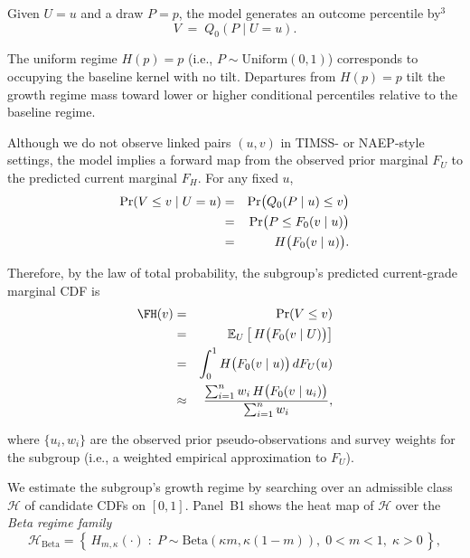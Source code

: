 \documentclass[10pt]{article}
\begin{document}
\begin{minipage}[t]{7.65in}
\begin{minipage}{7.35in}
    \vspace{1pt}
    Given $U=u$ and a draw $P=p$, the model generates an outcome percentile by$^\mbox{3}$
    \[
      V \;=\; Q_0(P\mid U=u).
    \]

    \vspace{1pt}
    The uniform regime $H(p)=p$ (i.e., $P\sim\mathrm{Uniform}(0,1)$) corresponds to occupying the 
    baseline kernel with no tilt. Departures from $H(p)=p$ tilt the growth regime mass toward 
    lower or higher conditional percentiles relative to the baseline regime.

    \vspace{4pt}
    Although we do not observe linked pairs $(u,v)$ in TIMSS- or NAEP-style settings, 
    the model implies a forward map from the observed prior marginal $F_U$ to the 
    predicted current marginal $F_H$. For any fixed $u$,
    \begin{eqnarray*}
      \Pr(V\le v\mid U=u)
      &=& \Pr\bigl(Q_0(P\mid u)\le v\bigr) \\
      &=& \Pr\bigl(P\le F_0(v\mid u)\bigr) \\
      &=& H\bigl(F_0(v\mid u)\bigr).
    \end{eqnarray*}

    \vspace{4pt}
    Therefore, by the law of total probability, the subgroup's predicted current-grade 
    marginal CDF is
    \begin{eqnarray*}
      \FH(v)
      &=& \Pr(V\le v) \\
      &=& \mathbb{E}_{U}\left[\,H\bigl(\Fzero(v\mid U)\bigr)\right] \\
      &=& \int_0^1 H\bigl(\Fzero(v\mid u)\bigr)\,dF_U(u) \\
      &\approx& \frac{\sum_{i=1}^{n} w_i\,H\bigl(\Fzero(v\mid u_i)\bigr)}{\sum_{i=1}^{n} w_i},
    \end{eqnarray*}

    \vspace{1pt}
    where $\{u_i,w_i\}$ are the observed prior pseudo-observations and 
    survey weights for the subgroup (i.e., a weighted empirical approximation to $F_U$).

    \vspace{4pt}
    We estimate the subgroup's growth regime by searching over an admissible 
    class $\mathcal{H}$ of candidate CDFs on $[0,1]$. Panel~B1 shows the heat 
    map of $\mathcal{H}$ over the \emph{Beta regime family}
    \[
      \mathcal{H}_{\mathrm{Beta}}
      =\left\{\,H_{m,\kappa}(\cdot)\;:\;P\sim\mathrm{Beta}(\kappa m,\kappa(1-m)),\;0<m<1,\;\kappa>0\,\right\},
    \]
    

\end{minipage}
\end{minipage}
\end{document}
